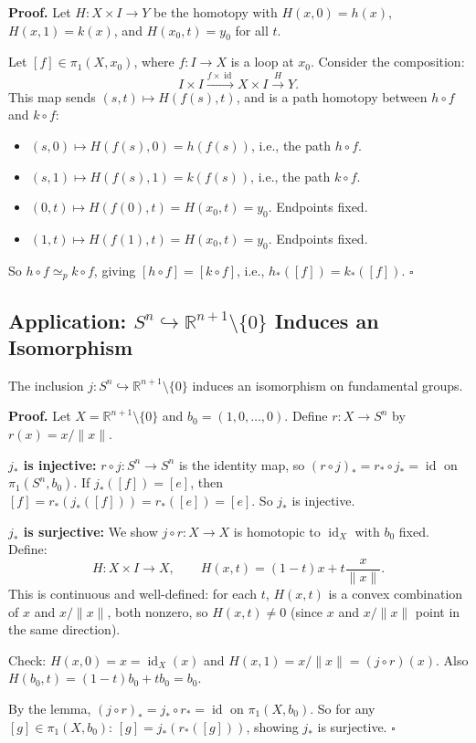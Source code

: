 \documentclass[11pt]{report}
\renewenvironment{proof}[1][Proof]{\noindent\textbf{#1.} }{\hfill$\square$\par\vspace{5pt}}
\begin{document}
\begin{proof}
Let $H: X \times I \to Y$ be the homotopy with $H(x, 0) = h(x)$, $H(x, 1) = k(x)$, and $H(x_0, t) = y_0$ for all $t$.

Let $[f] \in \pi_1(X, x_0)$, where $f: I \to X$ is a loop at $x_0$. Consider the composition:
\[I \times I \xrightarrow{f \times \operatorname{id}} X \times I \xrightarrow{H} Y.\]
This map sends $(s, t) \mapsto H(f(s), t)$, and is a path homotopy between $h \circ f$ and $k \circ f$:
\begin{itemize}[nosep]
    \item $(s, 0) \mapsto H(f(s), 0) = h(f(s))$, i.e., the path $h \circ f$.
    \item $(s, 1) \mapsto H(f(s), 1) = k(f(s))$, i.e., the path $k \circ f$.
    \item $(0, t) \mapsto H(f(0), t) = H(x_0, t) = y_0$. Endpoints fixed.
    \item $(1, t) \mapsto H(f(1), t) = H(x_0, t) = y_0$. Endpoints fixed.
\end{itemize}
So $h \circ f \simeq_p k \circ f$, giving $[h \circ f] = [k \circ f]$, i.e., $h_*([f]) = k_*([f])$.
\end{proof}

\subsection{Application: $S^n \hookrightarrow \mathbb{R}^{n+1} \setminus \{0\}$ Induces an Isomorphism}

\begin{thmbox}
The inclusion $j: S^n \hookrightarrow \mathbb{R}^{n+1} \setminus \{0\}$ induces an isomorphism on fundamental groups.
\end{thmbox}

\begin{proof}
Let $X = \mathbb{R}^{n+1} \setminus \{0\}$ and $b_0 = (1, 0, \ldots, 0)$. Define $r: X \to S^n$ by $r(x) = x / \|x\|$.

\textbf{$j_*$ is injective:} $r \circ j: S^n \to S^n$ is the identity map, so $(r \circ j)_* = r_* \circ j_* = \operatorname{id}$ on $\pi_1(S^n, b_0)$. If $j_*([f]) = [e]$, then $[f] = r_*(j_*([f])) = r_*([e]) = [e]$. So $j_*$ is injective.

\textbf{$j_*$ is surjective:} We show $j \circ r: X \to X$ is homotopic to $\operatorname{id}_X$ with $b_0$ fixed. Define:
\[H: X \times I \to X, \qquad H(x, t) = (1-t)x + t\frac{x}{\|x\|}.\]
This is continuous and well-defined: for each $t$, $H(x, t)$ is a convex combination of $x$ and $x/\|x\|$, both nonzero, so $H(x, t) \neq 0$ (since $x$ and $x/\|x\|$ point in the same direction).

Check: $H(x, 0) = x = \operatorname{id}_X(x)$ and $H(x, 1) = x/\|x\| = (j \circ r)(x)$. Also $H(b_0, t) = (1-t)b_0 + tb_0 = b_0$.

By the lemma, $(j \circ r)_* = j_* \circ r_* = \operatorname{id}$ on $\pi_1(X, b_0)$. So for any $[g] \in \pi_1(X, b_0)$: $[g] = j_*(r_*([g]))$, showing $j_*$ is surjective.
\end{proof}
\end{document}
